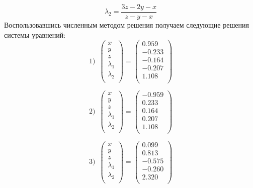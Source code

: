 \documentclass[a5paper, 10pt]{article}
\theoremstyle{definition}
\theoremstyle{plain}
\theoremstyle{remark}
\begin{document}
\begin{equation}
\lambda_2  = \frac{ 3z-2y-x}{z - y - x}
\end{equation}
Воспользовавшись численным методом решения получаем следующие решения системы уравнений:
\begin{equation}
1) \, \, \, 
\begin{pmatrix}
x \\
y \\
z \\
\lambda_1\\
\lambda_2\\
\end{pmatrix}
=
\begin{pmatrix}
0.959 \\
-0.233 \\
-0.164 \\
-0.207\\
1.108\\
\end{pmatrix}
\end{equation}

\begin{equation}
2) \, \, \, 
\begin{pmatrix}
x \\
y \\
z \\
\lambda_1\\
\lambda_2\\
\end{pmatrix}
=
\begin{pmatrix}
-0.959 \\
0.233 \\
0.164 \\
0.207\\
1.108\\
\end{pmatrix}
\end{equation}

\begin{equation}
3) \, \, \, 
\begin{pmatrix}
x \\
y \\
z \\
\lambda_1\\
\lambda_2\\
\end{pmatrix}
=
\begin{pmatrix}
0.099 \\
0.813 \\
-0.575 \\
-0.260\\
2.320\\
\end{pmatrix}
\end{equation}
\end{document}
